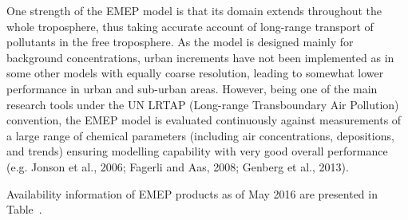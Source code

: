 \documentclass[9pt]{report}
\begin{document}
One strength of the EMEP model is that its domain extends throughout the whole troposphere, thus taking accurate account of long-range transport of pollutants in the free troposphere. 
As the model is designed mainly for background concentrations, urban increments have not been implemented as in some other models with equally coarse resolution, leading to somewhat lower performance in urban and sub-urban areas. 
However, being one of the main research tools under the UN LRTAP (Long-range Transboundary Air Pollution) convention, the EMEP model is evaluated continuously against measurements of a large range of chemical parameters (including air concentrations, depositions, and trends) ensuring modelling capability with very good overall performance (e.g. Jonson et al., 2006; Fagerli and Aas, 2008; Genberg et al., 2013).%

Availability information of EMEP products as of May 2016 are presented in Table~.%

\begin{table}[h!]%
\begin{mdcenter}%
{}%
\end{mdcenter}\label{emep-portfolio}%
\end{table}%
\end{document}

